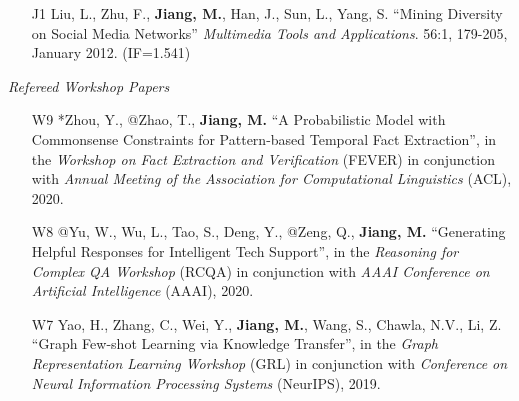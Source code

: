 \documentclass[10pt]{article}
\newenvironment{myindentpar}[1]%
{\begin{list}{}%
         {\setlength{\leftmargin}{#1}}%
         \item[]%
}
{\end{list}}
\newcounter{list}
\newcommand{\hide}[1]{}
\begin{document}
\begin{myindentpar}{0.00cm}
\begin{enumerate}[leftmargin=.5cm]
	\hide{\vspace{-0.1cm}\hspace{0.5cm}{\small \emph{I conceived the idea in consultation with Dr. Cui. I designed the study, completed the experiments, and wrote the paper. Dr. Cui edited the paper.}}}

\item[J1] Liu, L., Zhu, F., \textbf{Jiang, M.}, Han, J., Sun, L., Yang, S. ``Mining Diversity on Social Media Networks'' \textit{Multimedia Tools and Applications}. 56:1, 179-205, January 2012. (IF=1.541)

	\hide{\vspace{-0.1cm}\hspace{0.5cm}{\small \emph{Ms. Liu conceived the idea in consultation with myself. Ms. Liu, her colleague Dr. Zhu, and I implemented the system and completed the experiments.}}}

\end{enumerate}

\hspace{-0.25cm}\emph{Refereed Workshop Papers}

\begin{enumerate}[leftmargin=.5cm]

\item[W9] *Zhou, Y., @Zhao, T., \textbf{Jiang, M.} ``A Probabilistic Model with Commonsense Constraints for Pattern-based Temporal Fact Extraction'', in the \textit{Workshop on Fact Extraction and Verification} (FEVER) in conjunction with \textit{Annual Meeting of the Association for Computational Linguistics} (ACL), 2020.

\item[W8] @Yu, W., Wu, L., Tao, S., Deng, Y., @Zeng, Q., \textbf{Jiang, M.} ``Generating Helpful Responses for Intelligent Tech Support'', in the \textit{Reasoning for Complex QA  Workshop} (RCQA) in conjunction with \textit{AAAI Conference on Artificial Intelligence} (AAAI), 2020.

\item[W7] Yao, H., Zhang, C., Wei, Y., \textbf{Jiang, M.}, Wang, S., Chawla, N.V., Li, Z. ``Graph Few-shot Learning via Knowledge Transfer'', in the \textit{Graph Representation Learning Workshop} (GRL) in conjunction with \textit{Conference on Neural Information Processing Systems} (NeurIPS), 2019.
	
	\hide{\vspace{-0.1cm}\hspace{0.5cm}{\small \emph{I made 5\% contribution. I joined the discussions and reviewed the paper.}}}
	

\end{enumerate}
\end{myindentpar}
\end{document}
